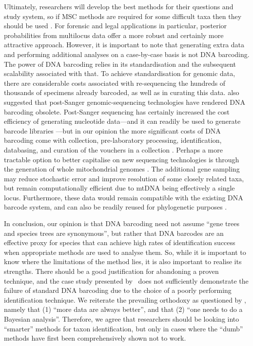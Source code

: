 \documentclass[12pt]{article}
\begin{document}
Ultimately, researchers will develop the best methods for their questions and study system, so if MSC methods are required for some difficult taxa then they should be used \citep{Dupuis2012}. For forensic and legal applications in particular, posterior probabilities from multilocus data offer a more robust and certainly more attractive approach. However, it is important to note that generating extra data and performing additional analyses on a case-by-case basis is not DNA barcoding. The power of DNA barcoding relies in its standardisation and the subsequent scalability associated with that. To achieve standardisation for genomic data, there are considerable costs associated with re-sequencing the hundreds of thousands of specimens already barcoded, as well as in curating this data. \citet{Taylor2012} also suggested that post-Sanger genomic-sequencing technologies have rendered DNA barcoding obsolete. Post-Sanger sequencing has certainly increased the cost efficiency of generating nucleotide data---and it can readily be used to generate barcode libraries \citep{Shokralla2014}---but in our opinion the more significant costs of DNA barcoding come with collection, pre-laboratory processing, identification, databasing, and curation of the vouchers in a collection \citep{Gregory2005,Borisenko2009,Puillandre2012a}. Perhaps a more tractable option to better capitalise on new sequencing technologies is through the generation of whole mitochondrial genomes \citep[see][]{Gillett2014}. The additional gene sampling may reduce stochastic error and improve resolution of some closely related taxa, but remain computationally efficient due to mtDNA being effectively a single locus. Furthermore, these data would remain compatible with the existing DNA barcode system, and can also be readily reused for phylogenetic purposes \citep{Gillett2014}.

In conclusion, our opinion is that DNA barcoding need not assume ``gene trees and species trees are synonymous'', but rather that DNA barcodes are an effective proxy for species that can achieve high rates of identification success when appropriate methods are used to analyse them. So, while it is important to know where the limitations of the method lies, it is also important to realise its strengths. There should be a good justification for abandoning a proven technique, and the case study presented by \citeauthor{Dowton2014}\ does not sufficiently demonstrate the failure of standard DNA barcoding due to the choice of a poorly performing identification technique.  We reiterate the prevailing orthodoxy as questioned by \citet{Karl2012}, namely that (1) ``more data are always better'', and that (2) ``one needs to do a Bayesian analysis''. Therefore, we agree that researchers should be looking into ``smarter'' methods for taxon identification, but only in cases where the ``dumb'' methods have first been comprehensively shown not to work.
\end{document}

